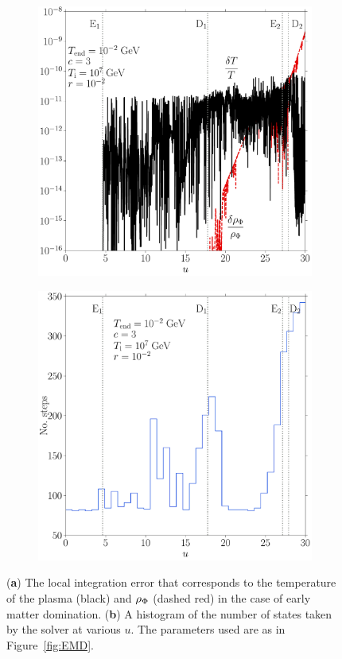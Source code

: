 \documentclass[11pt,a4paper]{article}
\begin{document}
\begin{figure}[t]
	\begin{subfigure}{0.5\textwidth}
		\includegraphics[width=1\textwidth]{EMD_err.pdf}
		\caption{}
		\label{fig:EMD_err}
	\end{subfigure}
	\begin{subfigure}{0.5\textwidth}
		\includegraphics[width=1\textwidth]{EMD_hist.pdf}
		\caption{}
		\label{fig:EMD_hist}
	\end{subfigure}
	\caption{			
		({\bfseries a}) The local integration error that corresponds to the temperature of the plasma (black) and $\rho_{\Phi}$ (dashed red) in the case of early matter domination. 
		({\bfseries b}) A histogram of the number of states taken by the solver at various $u$.
		The parameters used are as in Figure~\ref{fig:EMD}.
	}
	\label{fig:error_examples_MD}
\end{figure}
\end{document}
